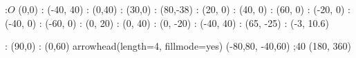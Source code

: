 \begin{marginfigure}
:$O$ (0,0)
: (-40, 40) 
: (0,40)
: (30,0)
: (80,-38)
: (20, 0)
: (40, 0)
: (60, 0)
: (-20, 0)
: (-40, 0)
: (-60, 0)
: (0, 20)
: (0, 40)
: (0, -20)
: (-40, 40)
: (65, -25)
: (-3, 10.6)

: (90,0)
: (0,60)
\figdrawbegin{}
\figset arrowhead(length=4, fillmode=yes) %
(-80,80, -40,60)
;40 (180, 360)
\figdrawcurve [15,1,2,14,3]
\figdrawend
\centerline{\box\figBoxA}
\end{marginfigure}


\ifprintanswers
\fi 

